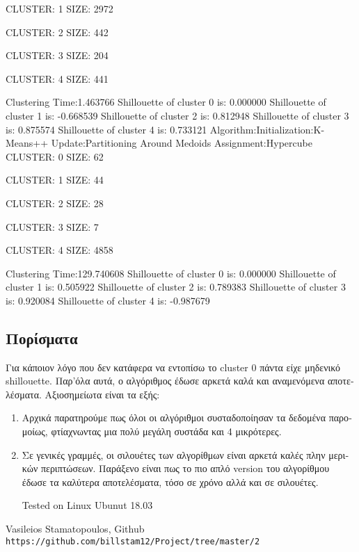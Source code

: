 \documentclass{article}
\begin{document}
CLUSTER: 1 SIZE: 2972 

CLUSTER: 2 SIZE: 442 

CLUSTER: 3 SIZE: 204 

CLUSTER: 4 SIZE: 441 

Clustering Time:1.463766
Shillouette of cluster 0 is: 0.000000
Shillouette of cluster 1 is: -0.668539
Shillouette of cluster 2 is: 0.812948
Shillouette of cluster 3 is: 0.875574
Shillouette of cluster 4 is: 0.733121
Algorithm:Initialization:K-Means++ Update:Partitioning Around Medoids Assignment:Hypercube
CLUSTER: 0 SIZE: 62 

CLUSTER: 1 SIZE: 44 

CLUSTER: 2 SIZE: 28

CLUSTER: 3 SIZE: 7 

CLUSTER: 4 SIZE: 4858 

Clustering Time:129.740608
Shillouette of cluster 0 is: 0.000000
Shillouette of cluster 1 is: 0.505922
Shillouette of cluster 2 is: 0.789383
Shillouette of cluster 3 is: 0.920084
Shillouette of cluster 4 is: -0.987679


\subsection{\textgreek{Πορίσματα}}
\textgreek{Για κάποιον λόγο που δεν κατάφερα να εντοπίσω το} cluster \textgreek{ 0 πάντα είχε μηδενικό} shillouette.
\textgreek{Παρ'όλα αυτά, ο αλγόριθμος έδωσε αρκετά καλά και αναμενόμενα αποτελέσματα. Αξιοσημείωτα είναι τα εξής:}
\begin{enumerate}
\item{\textgreek{ Αρχικά παρατηρούμε πως όλοι οι αλγόριθμοι συσταδοποίησαν τα δεδομένα παρομοίως, φτίαχνωντας μια πολύ μεγάλη συστάδα και 4 μικρότερες.}}
\item{\textgreek{Σε γενικές γραμμές, οι σιλουέτες των αλγορίθμων είναι αρκετά καλές πλην μερικών περιπτώσεων. Παράξενο είναι πως το πιο απλό }version \textgreek{του αλγορίθμου έδωσε τα καλύτερα αποτελέσματα, τόσο σε χρόνο αλλά και σε σιλουέτες.}}


Tested on Linux Ubunut 18.03
\end{enumerate}
\begin{thebibliography}{3}
Vasileios Stamatopoulos, Github
\\\texttt{https://github.com/billstam12/Project/tree/master/2}
\end{thebibliography}
 
\end{document}
